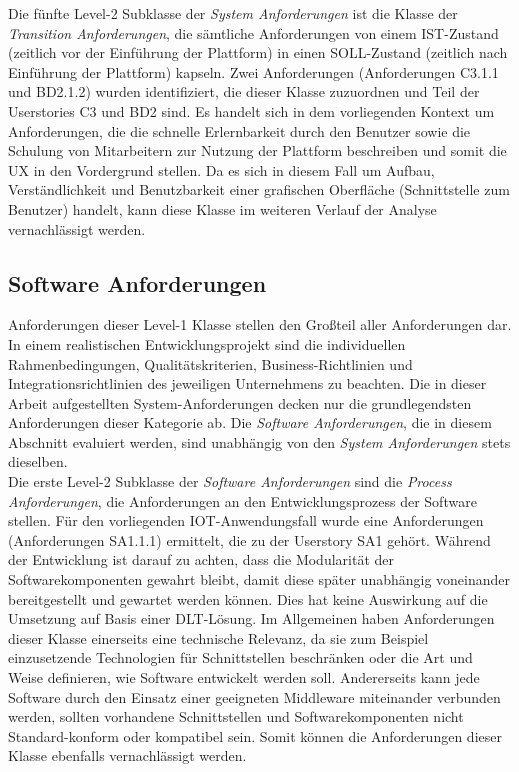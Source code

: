 Die fünfte Level-2 Subklasse der \textit{System Anforderungen} ist die Klasse der \textit{Transition Anforderungen}, die sämtliche Anforderungen von einem IST-Zustand (zeitlich vor der Einführung der Plattform) in einen SOLL-Zustand (zeitlich nach Einführung der Plattform) kapseln. Zwei Anforderungen (Anforderungen C3.1.1 und BD2.1.2) wurden identifiziert, die dieser Klasse zuzuordnen und Teil der Userstories C3 und BD2 sind. Es handelt sich in dem vorliegenden Kontext um Anforderungen, die die schnelle Erlernbarkeit durch den Benutzer sowie die Schulung von Mitarbeitern zur Nutzung der Plattform beschreiben und somit die \ac{UX} in den Vordergrund stellen. Da es sich in diesem Fall um Aufbau, Verständlichkeit und Benutzbarkeit einer grafischen Oberfläche (Schnittstelle zum Benutzer) handelt, kann diese Klasse im weiteren Verlauf der Analyse vernachlässigt werden.\\

\subsection{Software Anforderungen}
\label{subsec:requirements:evaluation:software}
Anforderungen dieser Level-1 Klasse stellen den Großteil aller Anforderungen dar. In einem realistischen Entwicklungsprojekt sind die individuellen Rahmenbedingungen, Qualitätskriterien, Business-Richtlinien und Integrationsrichtlinien des jeweiligen Unternehmens zu beachten. Die in dieser Arbeit aufgestellten System-Anforderungen decken nur die grundlegendsten Anforderungen dieser Kategorie ab. Die \textit{Software Anforderungen}, die in diesem Abschnitt evaluiert werden, sind unabhängig von den \textit{System Anforderungen} stets dieselben.\\

Die erste Level-2 Subklasse der \textit{Software Anforderungen} sind die \textit{Process Anforderungen}, die Anforderungen an den Entwicklungsprozess der Software stellen. Für den vorliegenden IOT-Anwendungsfall wurde eine Anforderungen (Anforderungen SA1.1.1) ermittelt, die zu der Userstory SA1 gehört. Während der Entwicklung ist darauf zu achten, dass die Modularität der Softwarekomponenten gewahrt bleibt, damit diese später unabhängig voneinander bereitgestellt und gewartet werden können. Dies hat keine Auswirkung auf die Umsetzung auf Basis einer \ac{DLT}-Lösung. Im Allgemeinen haben Anforderungen dieser Klasse einerseits eine technische Relevanz, da sie zum Beispiel einzusetzende Technologien für Schnittstellen beschränken oder die Art und Weise definieren, wie Software entwickelt werden soll. Andererseits kann jede Software durch den Einsatz einer geeigneten Middleware miteinander verbunden werden, sollten vorhandene Schnittstellen und Softwarekomponenten nicht Standard-konform oder kompatibel sein. Somit können die Anforderungen dieser Klasse ebenfalls vernachlässigt werden.\\


